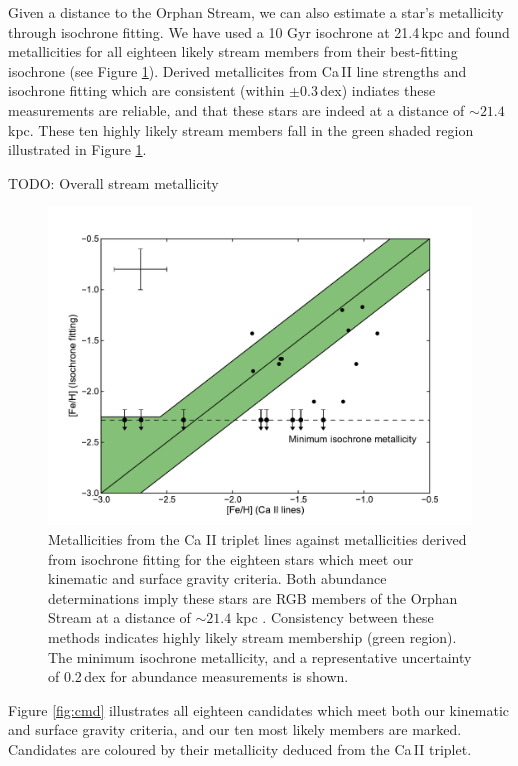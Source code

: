 \documentclass{emulateapj}
\begin{document}
Given a distance to the Orphan Stream, we can also estimate a star's metallicity through isochrone fitting. We have used a 10 Gyr \citet{Girardi;et-al_2008} isochrone at 21.4\,kpc \citep{Newberg;et-al_2010} and found metallicities for all eighteen likely stream members from their best-fitting isochrone (see Figure \ref{fig:feh}). Derived metallicites from Ca\,\textsc{II} line strengths and isochrone fitting which are consistent (within $\pm0.3$\,dex) indiates these measurements are reliable, and that these stars are indeed at a distance of $\sim21.4$\,kpc. These ten highly likely stream members fall in the green shaded region illustrated in Figure \ref{fig:feh}.

TODO: Overall stream metallicity

\begin{figure}[h]
	\includegraphics[width=\columnwidth]{./figures/feh.pdf}
	\caption{Metallicities from the Ca \textsc{II} triplet lines against metallicities derived from isochrone fitting for the eighteen stars which meet our kinematic and surface gravity criteria. Both abundance determinations imply these stars are RGB members of the Orphan Stream at a distance of $\sim21.4$ kpc \citep{Newberg;et-al_2010}. Consistency between these methods indicates highly likely stream membership (green region). The minimum isochrone metallicity, and a representative uncertainty of 0.2\,dex for abundance measurements is shown.}
	\label{fig:feh}
\end{figure}


Figure \ref{fig:cmd} illustrates all eighteen candidates which meet both our kinematic and surface gravity criteria, and our ten most likely members are marked. Candidates are coloured by their metallicity deduced from the Ca\,\textsc{II} triplet. 
\end{document}

